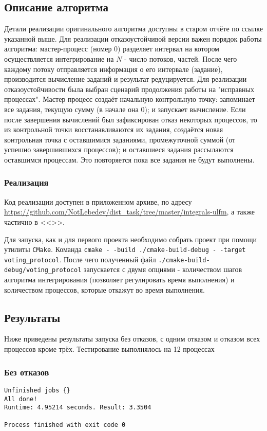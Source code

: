 \documentclass[a4paper,12pt,titlepage,finall]{article}
\begin{document}
\subsection{Описание алгоритма}
Детали реализации оригинального алгоритма доступны в старом отчёте по ссылке указанной выше. Для реализации отказоустойчивой версии важен порядок работы алгоритма: мастер-процесс (номер 0) разделяет интервал на котором осуществляется интегрирование на $N$ - число потоков, частей. После чего каждому потоку отправляется информация о его интервале (задание), производится вычисление заданий и результат редуцируется. Для реализации отказоустойчивости была выбран сценарий продолжения работы на "исправных процессах". Мастер процесс создаёт начальную контрольную точку: запоминает все задания, текущую сумму (в начале она 0); и запускает вычисление. Если после завершения вычислений был зафиксирован отказ некоторых процессов, то из контрольной точки восстанавливаются их задания, создаётся новая контрольная точка с оставшимися заданиями, промежуточной суммой (от успешно завершившихся процессов); и оставшиеся задания рассылаются оставшимся процессам. Это повторяется пока все задания не будут выполнены.

\subsubsection{Реализация}
Код реализации доступен в приложенном архиве, по адресу \url{https://github.com/NotLebedev/dist_task/tree/master/integrals-ulfm}, а также частично в <<>>.\par
Для запуска, как и для первого проекта необходимо собрать проект при помощи утилиты  \texttt{CMake}. Команда  \texttt{cmake - -build ./cmake-build-debug - -target voting\_protocol}. После чего полученный файл \texttt{./cmake-build-debug/voting\_protocol} запускается с двумя опциями - количеством шагов алгоритма интегрирования (позволяет регулировать время выполнения) и количеством процессов, которые откажут во время выполнения.

\subsection{Результаты}
Ниже приведены результаты запуска без отказов, с одним отказом и отказом всех процессов кроме трёх. Тестирование выполнялось на 12 процессах
\subsubsection{Без отказов}
\begin{lstlisting}
Unfinished jobs {}
All done!
Runtime: 4.95214 seconds. Result: 3.3504

Process finished with exit code 0
\end{lstlisting}
\end{document}
